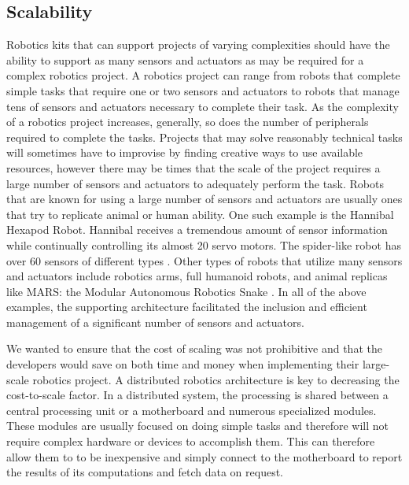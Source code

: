  

\subsection{Scalability} %
\label{sub:scalability}
Robotics kits that can support projects of varying complexities should have the ability to support as many sensors and actuators as may be required for a complex robotics project. A robotics project can range from robots that complete simple tasks that require one or two sensors and actuators to robots that manage tens of sensors and actuators necessary to complete their task. As the complexity of a robotics project increases, generally, so does the number of peripherals required to complete the tasks. Projects that may solve reasonably technical tasks will sometimes have to improvise by finding creative ways to use available resources, however there may be times that the scale of the project requires a large number of sensors and actuators to adequately perform the task. Robots that are known for using a large number of sensors and actuators are usually ones that try to replicate animal or human ability. One such example is the Hannibal Hexapod Robot. Hannibal receives a tremendous amount of sensor  information while continually controlling its almost 20 servo motors.  The spider-like robot has over 60 sensors of different types \cite{hannibal}. Other types of robots that utilize many sensors and actuators include robotics arms, full humanoid robots, and animal replicas like MARS: the Modular  Autonomous Robotics Snake \cite{mars}. In all of the above examples, the supporting architecture facilitated the inclusion and efficient management of a significant number of sensors and actuators.

 We wanted to ensure that the cost of scaling was not prohibitive and that the developers would save on both time and money when implementing their large-scale robotics project. A distributed robotics architecture is key to decreasing the cost-to-scale factor. In a distributed system, the processing is shared between a central processing unit or a motherboard and numerous specialized modules. These modules are usually focused on doing simple tasks and therefore will not require complex hardware or devices to accomplish them. This can therefore allow them to to be inexpensive and simply connect to the motherboard to report the results of its computations and fetch data on request.


